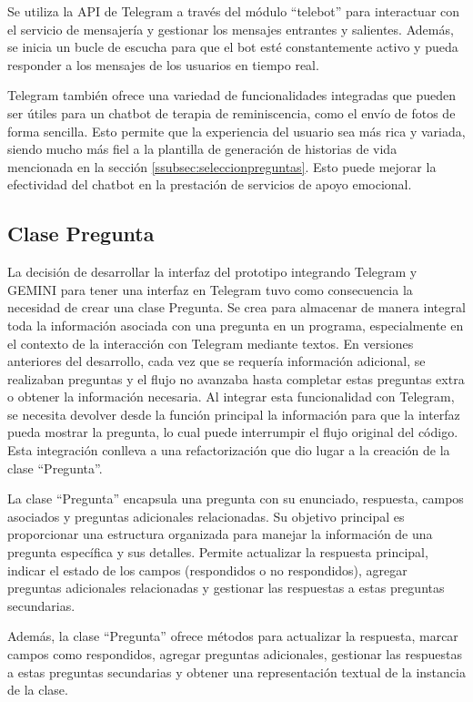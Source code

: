 Se utiliza la API de Telegram a través del módulo ``telebot'' para interactuar con el servicio de mensajería y gestionar los mensajes entrantes y salientes. Además, se inicia un bucle de escucha para que el bot esté constantemente activo y pueda responder a los mensajes de los usuarios en tiempo real.

Telegram también ofrece una variedad de funcionalidades integradas que pueden ser útiles para un chatbot de terapia de reminiscencia, como el envío de fotos de forma sencilla. Esto permite que la experiencia del usuario sea más rica y variada, siendo mucho más fiel a la plantilla de generación de historias de vida mencionada en la sección \ref{ssubsec:seleccionpreguntas}. Esto puede mejorar la efectividad del chatbot en la prestación de servicios de apoyo emocional.

\subsection{Clase Pregunta}
La decisión de desarrollar la interfaz del prototipo integrando Telegram y GEMINI para tener una interfaz en Telegram tuvo como consecuencia la necesidad de crear una clase Pregunta. Se crea para almacenar de manera integral toda la información asociada con una pregunta en un programa, especialmente en el contexto de la interacción con Telegram mediante textos. En versiones anteriores del desarrollo, cada vez que se requería información adicional, se realizaban preguntas y el flujo no avanzaba hasta completar estas preguntas extra o obtener la información necesaria. Al integrar esta funcionalidad con Telegram, se necesita devolver desde la función principal la información para que la interfaz pueda mostrar la pregunta, lo cual puede interrumpir el flujo original del código. Esta integración conlleva a una refactorización que dio lugar a la creación de la clase ``Pregunta''.

La clase ``Pregunta'' encapsula una pregunta con su enunciado, respuesta, campos asociados y preguntas adicionales relacionadas. Su objetivo principal es proporcionar una estructura organizada para manejar la información de una pregunta específica y sus detalles. Permite actualizar la respuesta principal, indicar el estado de los campos (respondidos o no respondidos), agregar preguntas adicionales relacionadas y gestionar las respuestas a estas preguntas secundarias.

Además, la clase ``Pregunta'' ofrece métodos para actualizar la respuesta, marcar campos como respondidos, agregar preguntas adicionales, gestionar las respuestas a estas preguntas secundarias y obtener una representación textual de la instancia de la clase.

